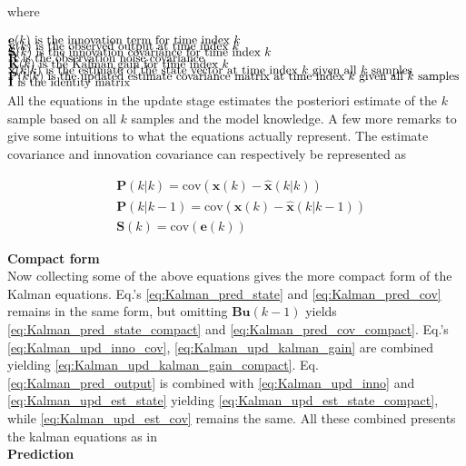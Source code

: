 where 

\begin{align*}
	&\text{$\textbf{e}		(k)$ 		is the innovation term for time index 					$ k $													}	\\[-1em]
	&\text{$\textbf{y}		(k)$ 		is the observed output at time index 					$ k $													}	\\[-1em]
	&\text{$\textbf{S}		(k)$ 		is the innovation covariance for time index 			$ k $											}	\\[-1em]
	&\text{$\textbf{R}$ 				is the observation noise covariance																}	\\[-1em]
	&\text{$\textbf{K}		(k)$ 		is the Kalman gain for time index 						$ k $													}	\\[-1em]
	&\text{$\hat{\textbf{x}}(k|k)$ 	is the estimate of the state vector at time index 			$ k $ given all 	$ k$ samples	}	\\[-1em]
	&\text{$\textbf{P}		(k|k)$ 	is the updated estimate covariance matrix at time index 	$ k $ given all 	$ k$ samples		}	\\[-1em]
	&\text{$\textbf{I}$ 				is the identity matrix																				}	\\[-1em]			
\end{align*}

All the equations in the update stage estimates the posteriori estimate of the $ k $ sample based on all $ k $ samples and the model knowledge. A few more remarks to give some intuitions to what the equations actually represent. The estimate covariance and innovation covariance can respectively be represented as 

\begin{align}
	&\textbf{P}(k|k) 	= \text{cov}(\textbf{x}(k)-	\hat{\textbf{x}}(k|k))	\\
	&\textbf{P}(k|k-1) 	= \text{cov}(\textbf{x}(k)-	\hat{\textbf{x}}(k|k-1)) 		\\
	&\textbf{S}(k) 		= \text{cov}(\textbf{e}(k)) 
\end{align}

\textbf{Compact form}\\
Now collecting some of the above equations gives the more compact form of the Kalman equations.
Eq.'s \ref{eq:Kalman_pred_state} and \ref{eq:Kalman_pred_cov} remains in the same form, but omitting $ \textbf{Bu}(k-1) $ yields \cref{eq:Kalman_pred_state_compact} and \cref{eq:Kalman_pred_cov_compact}. Eq.'s \ref{eq:Kalman_upd_inno_cov}, \ref{eq:Kalman_upd_kalman_gain} are combined yielding \cref{eq:Kalman_upd_kalman_gain_compact}. Eq. \ref{eq:Kalman_pred_output} is combined with \cref{eq:Kalman_upd_inno} and \cref{eq:Kalman_upd_est_state} yielding \cref{eq:Kalman_upd_est_state_compact}, while \cref{eq:Kalman_upd_est_cov} remains the same. All these combined presents the kalman equations as in \cite{Bozic1994}\\
\textbf{Prediction}

